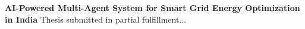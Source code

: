 \begin{titlepage}
\centering
\vspace*{3cm}
\Huge\textbf{AI-Powered Multi-Agent System for Smart Grid Energy Optimization in India}
\vspace{2cm}
\Large Thesis submitted in partial fulfillment...
\end{titlepage}